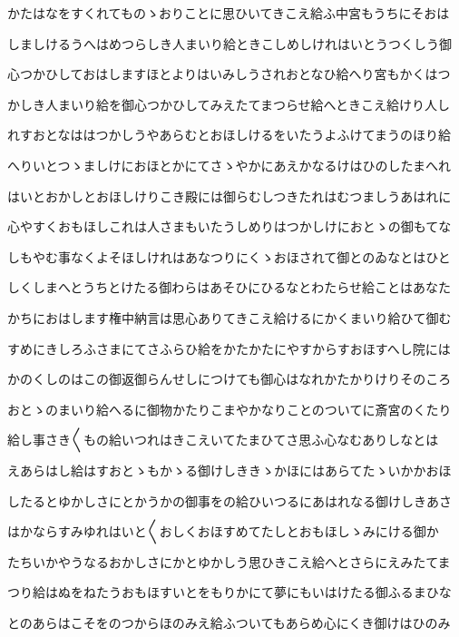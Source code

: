 \documentclass[a4paper,11pt,landscape]{ltjtarticle}
\begin{document}
\par\medskip
かたはなをすくれてものゝおりことに思ひいてきこえ給ふ中宮もうちにそおは
\par\medskip
しましけるうへはめつらしき人まいり給ときこしめしけれはいとうつくしう御
\par\medskip
心つかひしておはしますほとよりはいみしうされおとなひ給へり宮もかくはつ
\par\medskip
かしき人まいり給を御心つかひしてみえたてまつらせ給へときこえ給けり人し
\par\medskip
れすおとなははつかしうやあらむとおほしけるをいたうよふけてまうのほり給
\par\medskip
へりいとつゝましけにおほとかにてさゝやかにあえかなるけはひのしたまへれ
\par\medskip
はいとおかしとおほしけりこき殿には御らむしつきたれはむつましうあはれに
\par\medskip
心やすくおもほしこれは人さまもいたうしめりはつかしけにおとゝの御もてな
\par\medskip
しもやむ事なくよそほしけれはあなつりにくゝおほされて御とのゐなとはひと
\par\medskip
しくしまへとうちとけたる御わらはあそひにひるなとわたらせ給ことはあなた
\par\medskip
かちにおはします権中納言は思心ありてきこえ給けるにかくまいり給ひて御む
\par\medskip
すめにきしろふさまにてさふらひ給をかたかたにやすからすおほすへし院には
\par\medskip
かのくしのはこの御返御らんせしにつけても御心はなれかたかりけりそのころ
\par\medskip
おとゝのまいり給へるに御物かたりこまやかなりことのついてに斎宮のくたり
\par\medskip
給し事さき〱もの給いつれはきこえいてたまひてさ思ふ心なむありしなとは
\par\medskip
えあらはし給はすおとゝもかゝる御けしききゝかほにはあらてたゝいかかおほ
\par\medskip
したるとゆかしさにとかうかの御事をの給ひいつるにあはれなる御けしきあさ
\par\medskip
はかならすみゆれはいと〱おしくおほすめてたしとおもほしゝみにける御か
\par\medskip
たちいかやうなるおかしさにかとゆかしう思ひきこえ給へとさらにえみたてま
\par\medskip
つり給はぬをねたうおもほすいとをもりかにて夢にもいはけたる御ふるまひな
\par\medskip
とのあらはこそをのつからほのみえ給ふついてもあらめ心にくき御けはひのみ
\end{document}
